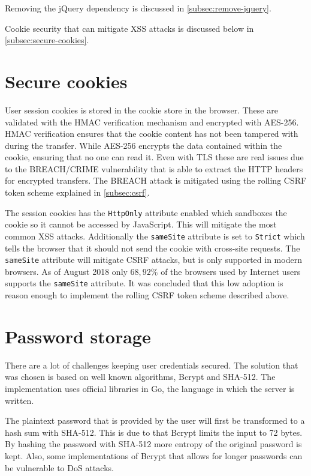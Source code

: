 \documentclass[12pt,a4paper]{report}
\begin{document}
Removing the jQuery dependency is discussed in \autoref{subsec:remove-jquery}.

Cookie security that can mitigate XSS attacks is discussed below in \autoref{subsec:secure-cookies}.

\section{Secure cookies}
\label{subsec:secure-cookies}
User session cookies is stored in the cookie store in the browser. These are validated with the HMAC verification mechanism and encrypted with AES-256. HMAC verification ensures that the cookie content has not been tampered with during the transfer\cite{fips-198}. While AES-256 encrypts the data contained within the cookie, ensuring that no one can read it\cite{fips-197}. Even with TLS these are real issues due to the BREACH/CRIME vulnerability that is able to extract the HTTP headers for encrypted transfers\cite{breach}. The BREACH attack is mitigated using the rolling CSRF token scheme explained in \autoref{subsec:csrf}.

The session cookies has the \texttt{HttpOnly} attribute enabled which sandboxes the cookie so it cannot be accessed by JavaScript. This will mitigate the most common XSS attacks\cite{owasp-httponly}. Additionally the \texttt{sameSite} attribute is set to \texttt{Strict} which tells the browser that it should not send the cookie with cross-site requests\cite{owasp-samesite}. The \texttt{sameSite} attribute will mitigate CSRF attacks, but is only supported in modern browsers. As of August 2018 only $68,92 \%$ of the browsers used by Internet users supports the \texttt{sameSite} attribute\cite{owasp-samesite-support}. It was concluded that this low adoption is reason enough to implement the rolling CSRF token scheme described above.

\section{Password storage}
There are a lot of challenges keeping user credentials secured. The solution that was chosen is based on well known algorithms, Bcrypt and SHA-512. The implementation uses official libraries in Go, the language in which the server is written.

The plaintext password that is provided by the user will first be transformed to a hash sum with SHA-512. This is due to that Bcrypt limits the input to 72 bytes. By hashing the password with SHA-512 more entropy of the original password is kept. Also, some implementations of Bcrypt that allows for longer passwords can be vulnerable to DoS attacks\cite{bcrypt-length}.
\end{document}
